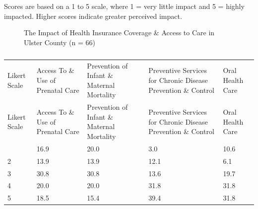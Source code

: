 \documentclass[
  english,
  letterpaper,
]{report}
\begin{document}
\begin{tcolorbox}[enhanced jigsaw, breakable, leftrule=.75mm, title=\textcolor{quarto-callout-note-color}{\faInfo}\hspace{0.5em}{Note}, bottomrule=.15mm, opacityback=0, left=2mm, colback=white, bottomtitle=1mm, coltitle=black, colbacktitle=quarto-callout-note-color!10!white, colframe=quarto-callout-note-color-frame, opacitybacktitle=0.6, toptitle=1mm, titlerule=0mm, arc=.35mm, rightrule=.15mm, toprule=.15mm]

Scores are based on a 1 to 5 scale, where 1 = very little impact and 5 =
highly impacted. Higher scores indicate greater perceived impact.

\end{tcolorbox}

\begin{figure}


\caption{\label{fig-uc-impact-hlthinsur-access}The Impact of Health
Insurance Coverage \& Access to Care in Ulster County (n = 66)}

\end{figure}%

\begin{longtable}[]{@{}lllll@{}}

\caption{\label{tbl-uc-impact-hlthinsur-access}The Impact of Health
Insurance Coverage \& Access to Care in Ulster County (n = 66)}

\tabularnewline

\caption{}\label{T_8fb28}\tabularnewline
\toprule\noalign{}
Likert Scale & Access To \& Use of Prenatal Care & Prevention of Infant
\& Maternal Mortality & Preventive Services for Chronic Disease
Prevention \& Control & Oral Health Care \\
\midrule\noalign{}
\endfirsthead
\toprule\noalign{}
Likert Scale & Access To \& Use of Prenatal Care & Prevention of Infant
\& Maternal Mortality & Preventive Services for Chronic Disease
Prevention \& Control & Oral Health Care \\
\midrule\noalign{}
\endhead
\bottomrule\noalign{}
\endlastfoot
1 & 16.9 & 20.0 & 3.0 & 10.6 \\
2 & 13.9 & 13.9 & 12.1 & 6.1 \\
3 & 30.8 & 30.8 & 13.6 & 19.7 \\
4 & 20.0 & 20.0 & 31.8 & 31.8 \\
5 & 18.5 & 15.4 & 39.4 & 31.8 \\

\end{longtable}
\end{document}
